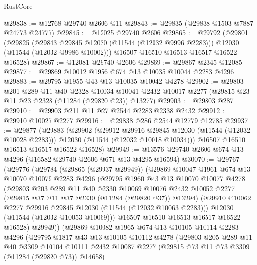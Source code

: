 \begin{lexlean}{RustCore}
\begin{coremodule}
@29838 := @12768 @29740 @2606 @11
@29843 := @29835 (@29838 @1503 @7887 @24773 @24777)
@29845 := @12025 @29740 @2606
@29865 := @29792
    (@29801
      (@29825
        (@29843 @29845 @12030 (@11544 (@12032 @9996 @2283)))
        @12030
        (@11544 (@12032 @9986 @10002)))
      @16507
      @16510
      @16513
      @16517
      @16522
      @16528)
@29867 := @12081 @29740 @2606
@29869 := @29867 @2345 @12085
@29877 := @29869 @10012 @1956 @674 @13 @10035 @10044 @2283 @4296
@29883 := @29795 @1955 @43 @13 @10035 @10042 @4278
@29902 := @29803
    @201
    @289
    @11
    @40
    @2328
    @10034
    @10041
    @2432
    @10017
    @2277
    (@29815 @23 @11 @23 @2328 (@11284 (@29820 @23)) @13277)
@29903 := @29803 @287
@29910 := @29903 @211 @11 @27 @2544 @2283 @2338 @2432
@29912 := @29910 @10027 @2277
@29916 := @29838 @286 @2544 @12779 @12785
@29937 := @29877
    (@29883
      (@29902
        (@29912 @29916 @29845 @12030 (@11544 (@12032 @10028 @2283)))
        @12030
        (@11544 (@12032 @10018 @10034)))
      @16507
      @16510
      @16513
      @16517
      @16522
      @16528)
@29949 := @13576 @29740 @2606 @674 @13 @4296 (@16582 @29740 @2606 @671 @13 @4295 @16594)
@30070 := @29767
    (@29776
      (@29784
        (@29865 (@29937 @29949))
        (@29869
          @10047
          @1961
          @674
          @13
          @10070
          @10079
          @2283
          @4296
          (@29795
            @1960
            @43
            @13
            @10070
            @10077
            @4278
            (@29803
              @203
              @289
              @11
              @40
              @2330
              @10069
              @10076
              @2432
              @10052
              @2277
              (@29815 @37 @11 @37 @2330 (@11284 (@29820 @37)) @13294)
              (@29910 @10062 @2277 @29916 @29845 @12030 (@11544 (@12032 @10063 @2283)))
              @12030
              (@11544 (@12032 @10053 @10069)))
            @16507
            @16510
            @16513
            @16517
            @16522
            @16528)
          @29949))
      (@29869
        @10082
        @1965
        @674
        @13
        @10105
        @10114
        @2283
        @4296
        (@29795
          @1817
          @43
          @13
          @10105
          @10112
          @4278
          (@29803
            @205
            @289
            @11
            @40
            @3309
            @10104
            @10111
            @2432
            @10087
            @2277
            (@29815 @73 @11 @73 @3309 (@11284 (@29820 @73)) @14658)

\end{coremodule}
\end{lexlean}
